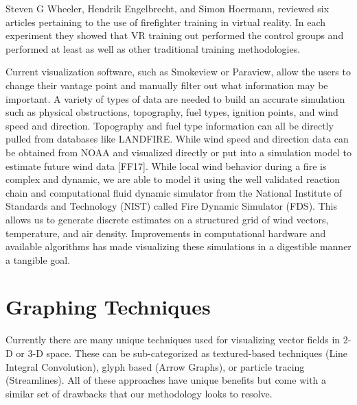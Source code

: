 Steven G Wheeler, Hendrik Engelbrecht, and Simon Hoermann, reviewed six articles pertaining to the use of firefighter training in virtual reality\cite{Wheeler2021}. In each experiment they showed that VR training out performed the control groups and performed at least as well as other traditional training methodologies.  \par

Current visualization software, such as  Smokeview or Paraview, allow the users to change their vantage point and manually filter out what information may be important. 
A variety of types of data are needed to build an accurate simulation such as physical  obstructions, topography, fuel types, ignition points, and wind speed and direction.
Topography and fuel type information can all be directly pulled from databases like LANDFIRE. While wind speed and direction data can be obtained from NOAA and visualized directly or put into a simulation model to estimate future wind data [FF17]. While local wind behavior during a fire is complex and dynamic, we are able to model it using the well validated reaction chain and computational fluid dynamic simulator from the National Institute of Standards and Technology (NIST) called Fire Dynamic Simulator (FDS)\cite{FDSValid}.  This allows us to generate discrete estimates on a structured grid of wind vectors, temperature, and air density. Improvements in computational hardware and available algorithms has made visualizing these simulations in a digestible manner a tangible goal. 
\par






\section{Graphing Techniques}

Currently there are many unique techniques used for visualizing vector fields in 2-D or 3-D space. These can be sub-categorized as textured-based techniques (Line Integral Convolution), glyph based (Arrow Graphs), or particle tracing (Streamlines). All of these approaches have unique benefits but come with a similar set of drawbacks that our methodology looks to resolve.  \par


